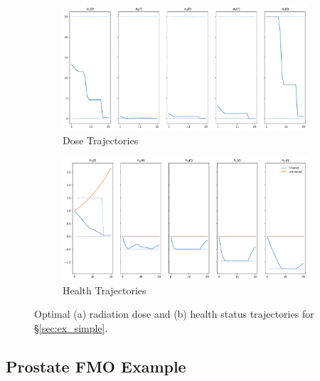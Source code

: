\documentclass[12pt]{article}
\begin{document}
\begin{figure}
	\begin{center}
		\begin{subfigure}[b]{0.95\textwidth}
			\caption{Dose Trajectories}
			\label{fig:ex1_traj_dose}
			\includegraphics[width=\textwidth]{figures/ex1_doses.png}
		\end{subfigure}
		\par\bigskip
		\begin{subfigure}[b]{0.95\textwidth}
			\caption{Health Trajectories}
			\label{fig:ex1_traj_health}
			\includegraphics[width=\textwidth]{figures/ex1_health.png}
		\end{subfigure}
		\caption{Optimal (a) radiation dose and (b) health status trajectories for \S\ref{sec:ex_simple}.}
		\label{fig:ex1_traj}
	\end{center}
\end{figure}

\subsection{Prostate FMO Example}
\label{sec:ex_prostate}
\end{document}
